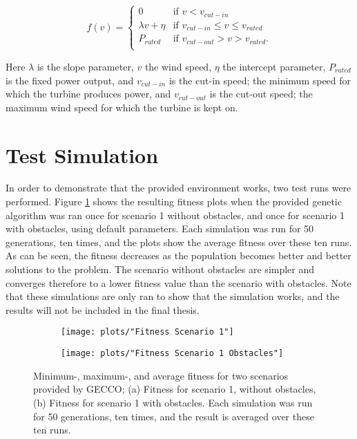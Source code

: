 \begin{equation}
 f(v) = 
  \begin{cases} 
   0                                  & \text{if }     v < v_{cut-in} \\
   \lambda v + \eta           & \text{if }     v_{cut-in} \leq v \leq v_{rated} \\
   P_{rated}                        & \text{if }     v_{cut-out} > v > v_{rated}. \\
  \end{cases}
  \label{equation:Power Curv (API)}
\end{equation}

\noindent Here $\lambda$ is the slope parameter, $v$ the wind speed, $\eta$ the intercept parameter, $P_{rated}$ is the fixed power output, and $v_{cut-in}$ is the cut-in speed; the minimum speed for which the turbine produces power, and $v_{cut-out}$ is the cut-out speed; the maximum wind speed for which the turbine is kept on. 


\section{Test Simulation}\label{section:testsimulation}
In order to demonstrate that the provided environment works, two test runs were performed. Figure \ref{Test Plots} shows the resulting fitness plots when the provided genetic algorithm was ran once for scenario 1 without obstacles, and once for scenario 1 with obstacles, using default parameters. Each simulation was run for 50 generations, ten times, and the plots show the average fitness over these ten runs. As can be seen, the fitness decreases as the population becomes better and better solutions to the problem. The scenario without obstacles are simpler and converges therefore to a lower fitness value than the scenario with obstacles. Note that these simulations are only ran to show that the simulation works, and the results will not be included in the final thesis. 


\begin{figure}[h!]
    \centering
    \begin{subfigure}[b]{0.45\textwidth}
        \texttt{[image: plots/"Fitness Scenario 1"]}
        \caption{}
    \end{subfigure}
    \begin{subfigure}[b]{0.45\textwidth}
        \texttt{[image: plots/"Fitness Scenario 1 Obstacles"]}
        \caption{}
    \end{subfigure}
    \caption{Minimum-, maximum-, and average fitness for two scenarios provided by GECCO; (a) Fitness for scenario 1, without obstacles, (b) Fitness for scenario 1 with obstacles. Each simulation was run for 50 generations, ten times, and the result is averaged over these ten runs.}
    \label{Test Plots}
\end{figure}


